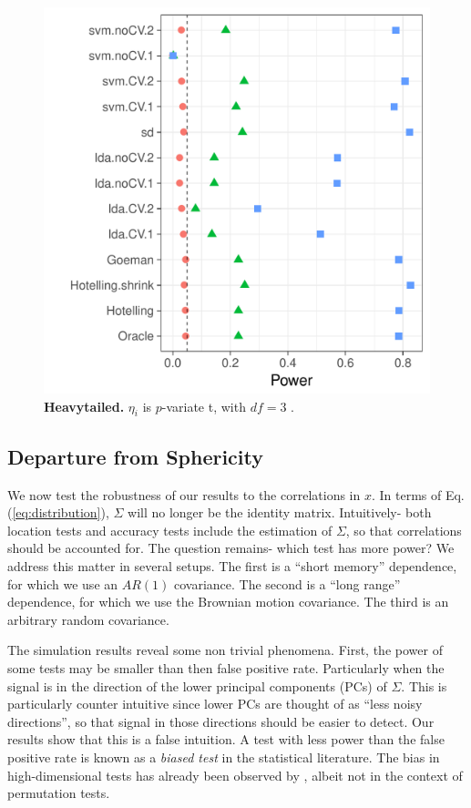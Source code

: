 \documentclass[12pt,a4paper]{article}
\begin{document}
\begin{figure}[th]
		\centering
		\includegraphics[width=0.5\linewidth]{"art/file9"}
		\caption{\textbf{Heavytailed.} $\eta_i$ is $p$-variate t, with $df=3$ .  } 
		\label{fig:t_null}
\end{figure}




\subsection{Departure from Sphericity}
\label{sec:dependence}

We now test the robustness of our results to the correlations in $x$. 
In terms of Eq.(\ref{eq:distribution}), $\Sigma$ will no longer be the identity matrix. 
Intuitively- both location tests and accuracy tests include the estimation of $\Sigma$, so that correlations should be accounted for. 
The question remains- which test has more power?
We address this matter in several setups. 
The first is a ``short memory'' dependence, for which we use an $AR(1)$ covariance.
The second is a ``long range'' dependence, for which we use the Brownian motion covariance. 
The third is an arbitrary random covariance.

The simulation results reveal some non trivial phenomena.
First, the power of some tests may be smaller than then false positive rate. 
Particularly when the signal is in the direction of the lower principal components (PCs) of $\Sigma$. 
This is particularly counter intuitive since lower PCs are thought of as ``less noisy directions'', so that signal in those directions should be easier to detect. 
Our results show that this is a false intuition.
A test with less power than the false positive rate is known as a \emph{biased test} in the statistical literature. 
The bias in high-dimensional tests has already been observed by \citet{goeman2006testing}, albeit not in the context of permutation tests.
\end{document}
